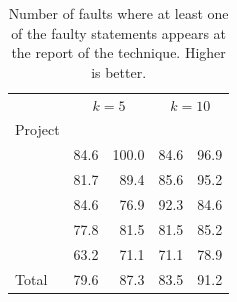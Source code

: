 \documentclass{article}
\begin{document}
%

\begin{table}[h]
	\small
	\setlength{\tabcolsep}{3pt}
	\centering
\begin{tabular}{l|rr|rr}
		 \toprule
       & \multicolumn{2}{c|}{$k=5$} & \multicolumn{2}{c}{$k=10$} \\
		 Project        &   \sfl{}   & \comb &   \sfl{}   & \comb\\
		\midrule
		 \lang{}         &   84.6   & 100.0 & 84.6 & 96.9  \\
		\cmath{}           & 81.7 & 89.4 & 85.6 & 95.2 \\
		\chart{}           & {\cellcolor{Gray} 84.6} & {\cellcolor{Gray}76.9} & {\cellcolor{Gray}92.3} & {\cellcolor{Gray}84.6}\\
		\jtime{}           & 77.8 & 81.5 & 81.5 & 85.2\\
		\mockito{}           & 63.2 & 71.1 & 71.1 & 78.9\\   \midrule
		Total         & 79.6 & 87.3 & 83.5 & 91.2\\
		\bottomrule
	\end{tabular}
  \caption {Number of faults where at least one of the faulty
    statements appears at the report of the technique. Higher is better.}
  \label{table:fsws}
\end{table}
\end{document}
